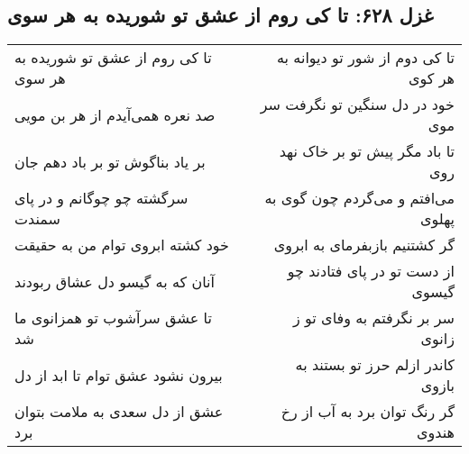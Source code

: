\begin{center}
\section*{غزل ۶۲۸: تا کی روم از عشق تو شوریده به هر سوی}
\label{sec:628}
\begin{longtable}{l p{0.5cm} r}
تا کی روم از عشق تو شوریده به هر سوی
&&
تا کی دوم از شور تو دیوانه به هر کوی
\\
صد نعره همی‌آیدم از هر بن مویی
&&
خود در دل سنگین تو نگرفت سر موی
\\
بر یاد بناگوش تو بر باد دهم جان
&&
تا باد مگر پیش تو بر خاک نهد روی
\\
سرگشته چو چوگانم و در پای سمندت
&&
می‌افتم و می‌گردم چون گوی به پهلوی
\\
خود کشته ابروی توام من به حقیقت
&&
گر کشتنیم بازبفرمای به ابروی
\\
آنان که به گیسو دل عشاق ربودند
&&
از دست تو در پای فتادند چو گیسوی
\\
تا عشق سرآشوب تو همزانوی ما شد
&&
سر بر نگرفتم به وفای تو ز زانوی
\\
بیرون نشود عشق توام تا ابد از دل
&&
کاندر ازلم حرز تو بستند به بازوی
\\
عشق از دل سعدی به ملامت بتوان برد
&&
گر رنگ توان برد به آب از رخ هندوی
\\
\end{longtable}
\end{center}
